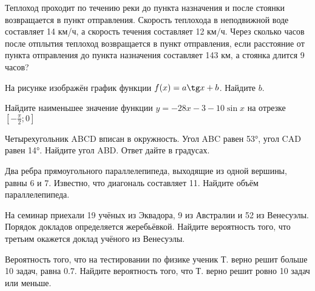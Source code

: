 \documentclass[twocolumn]{article}
\begin{document}
\begin{taskBN}{9}
Теплоход проходит по течению реки до пункта назначения и после стоянки возвращается в пункт отправления. Скорость теплохода в неподвижной воде составляет 14 км/ч, а скорость течения составляет 12 км/ч. Через сколько часов после отплытия теплоход возвращается в пункт отправления, если расстояние от пункта отправления до пункта назначения составляет 143 км, а стоянка длится 9 часов? 
\end{taskBN}

\begin{taskBN}{10}
На рисунке изображён график функции $f(x)=a\tg x+b$. Найдите $b$.\vspace{2.5cm}
\end{taskBN}

\begin{taskBN}{11}
Найдите наименьшее значение функции $y = -28x-3-10\sin x$ на отрезке $\left[-\frac{\pi}{2};0 \right]$
\end{taskBN}




\cleardoublepage
\def\examvart{Вариант 19.2}
\normalsize

\startpartone
\large




\begin{taskBN}{1}
Четырехугольник ABCD вписан в окружность. Угол ABC равен 53°, угол CAD равен 14°. Найдите угол ABD. Ответ дайте в градусах.
\end{taskBN}

\begin{taskBN}{2}
Два ребра прямоугольного параллелепипеда, выходящие из одной вершины, равны 6 и 7. Известно, что диагональ составляет 11. Найдите объём параллелепипеда.
\end{taskBN}

\begin{taskBN}{3}
На семинар приехали 19 учёных из Эквадора, 9 из Австралии и 52 из Венесуэлы. Порядок докладов определяется жеребьёвкой. Найдите вероятность того, что третьим окажется доклад учёного из Венесуэлы.
\end{taskBN}

\begin{taskBN}{4}
Вероятность того, что на тестировании по физике ученик Т. верно решит больше 10 задач, равна 0.7. Найдите вероятность того, что Т. верно решит ровно 10 задач  или меньше.
\end{taskBN}
\end{document}
